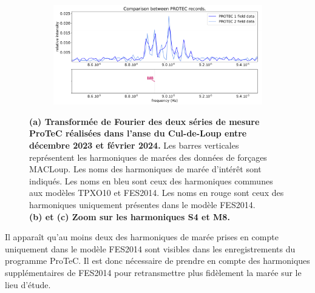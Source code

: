 \documentclass[10pt,a4paper,titlepage]{article}
\begin{document}
\begin{figure}[H]
    \begin{subfigure}{0.45\linewidth}
        \centering
        \includegraphics[width=\linewidth]{../images/post_traitement/PROTEC1_PROTEC2_analyse_zoom3.pdf}
        \caption{}
    \end{subfigure}
    \caption{
        \textbf{(a) Transformée de Fourier des deux séries de mesure ProTeC réalisées dans l'anse du Cul-de-Loup entre décembre 2023 et février 2024.}
        Les barres verticales représentent les harmoniques de marées des données de forçages MACLoup.
        Les noms des harmoniques de marée d'intérêt sont indiqués.
        Les noms en bleu sont ceux des harmoniques communes aux modèles TPXO10 et FES2014.
        Les noms en rouge sont ceux des harmoniques uniquement présentes dans le modèle FES2014.
        \\
        \textbf{(b) et (c) Zoom sur les harmoniques S4 et M8.}
    }
    \label{fig:ana_signaux_protec}
\end{figure}

Il apparaît qu'au moins deux des harmoniques de marée prises en compte uniquement dans le modèle FES2014 sont visibles dans les enregistrements du programme ProTeC.
Il est donc nécessaire de prendre en compte des harmoniques supplémentaires de FES2014 pour retransmettre plus fidèlement la marée sur le lieu d'étude.
\end{document}
